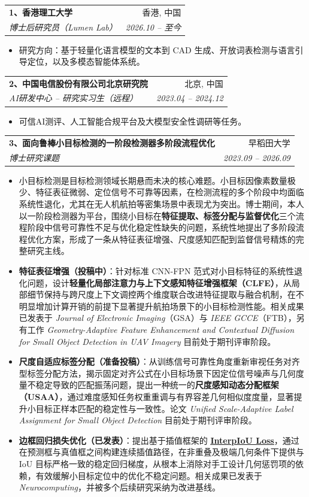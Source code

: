 \documentclass[letterpaper,11pt]{article}
\makeatletter
\newcommand{\resumeItem}[1]{
  \item[$\vcenter{\hbox{\tiny$\bullet$}}$]\small{
    {#1 \vspace{-2pt}}
  }
}
\newcommand{\resumeItemF}[1]{
  \item[] \small{
    {#1 \vspace{-2pt}}
  }
}
\newcommand{\resumeSubheading}[4]{
  \vspace{-2pt}\item
    \begin{tabular*}{0.97\textwidth}[t]{l@{\extracolsep{\fill}}r}
      \textbf{#1} & #2 \\
      \textit{\small#3} & \textit{\small #4} \\
    \end{tabular*}\vspace{-7pt}
}
\newcommand{\resumeItemListStart}{\begin{itemize}}
\newcommand{\resumeItemListEnd}{\end{itemize}\vspace{-5pt}}
\makeatother
\begin{document}
    \resumeSubheading
      {1、香港理工大学}{香港, 中国}
      {\quad 博士后研究员（Lumen Lab）}{2026.10 -- 至今}
      \resumeItemListStart
        \resumeItem{研究方向：基于轻量化语言模型的文本到 CAD 生成、开放词表检测与语言引导定位，以及多模态智能体系统。}
      \resumeItemListEnd
  \vspace{0.2cm}

    \resumeSubheading
      {2、中国电信股份有限公司北京研究院}{北京, 中国}
      {\quad AI研发中心 -- 研究实习生（远程）}{2023.04 -- 2024.12}
      \resumeItemListStart
        \resumeItem{可信AI测评、人工智能合规平台及大模型安全性调研等任务。}
      \resumeItemListEnd
  \vspace{0.2cm}
   \resumeSubheading
    {3、面向鲁棒小目标检测的一阶段检测器多阶段流程优化}{早稻田大学}
    {\quad 博士研究课题}{2023.09 -- 2026.09}
    \resumeItemListStart
    \resumeItemF{小目标检测是目标检测领域长期悬而未决的核心难题。小目标因像素数量极少、特征表征微弱、定位信号不可靠等因素，在检测流程的多个阶段中均面临系统性退化，尤其在无人机航拍等密集场景中表现尤为突出。博士期间，本人以一阶段检测器为平台，围绕小目标在\textbf{特征提取、标签分配与监督优化}三个流程阶段中信号可靠性不足与优化稳定性缺失的问题，系统性地提出了多阶段流程优化方案，形成了一条从特征表征增强、尺度感知匹配到监督信号精炼的完整研究主线。}
  \vspace{0.2cm}
  \resumeItem{\textbf{特征表征增强（投稿中）}：针对标准 CNN-FPN 范式对小目标特征的系统性退化问题，设计\textbf{轻量化局部注意力与上下文感知特征增强框架（CLFE）}，从局部细节保持与跨尺度上下文调控两个维度联合改进特征提取与融合机制，在不明显增加计算开销的前提下显著提升航拍场景下的小目标检测性能。相关成果已发表于 \textit{Journal of Electronic Imaging}（GSA）与 \textit{IEEE GCCE}（FTB），另有工作 \textit{Geometry-Adaptive Feature Enhancement and Contextual Diffusion for Small Object Detection in UAV Imagery} 目前处于期刊评审阶段。}
  \vspace{0.1cm}
  \resumeItem{\textbf{尺度自适应标签分配（准备投稿）}：从训练信号可靠性角度重新审视任务对齐型标签分配方法，揭示固定对齐公式在小目标场景下因定位信号噪声与几何度量不稳定导致的匹配振荡问题，提出一种统一的\textbf{尺度感知动态分配框架（USAA）}，通过难度感知任务权重重调与有界容差几何相似度度量，显著提升小目标正样本匹配的稳定性与一致性。论文 \textit{Unified Scale-Adaptive Label Assignment for Small Object Detection} 目前处于期刊评审阶段。}
  \vspace{0.1cm}
  \resumeItem{\textbf{边框回归损失优化（已发表）}：提出基于插值框架的 \href{https://github.com/NuayHL/interpiou}{\underline{\textbf{InterpIoU Loss}}}，通过在预测框与真值框之间构建连续插值路径，在非重叠及极端几何条件下提供与 IoU 目标严格一致的稳定回归梯度，从根本上消除对手工设计几何惩罚项的依赖，有效缓解小目标定位中的优化不稳定问题。相关成果已发表于 \textit{Neurocomputing}，并被多个后续研究采纳为改进基线。}
\resumeItemListEnd
\end{document}
